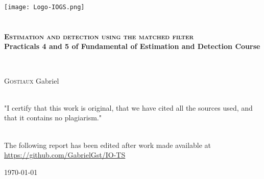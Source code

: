 \begin{titlepage}
\begin{center}

\texttt{[image: Logo-IOGS.png]}~\\[1.5cm]


\textsc{\Large }\\[0.5cm]

\HRule \\[0.4cm]

{\bfseries
\huge \textsc{Estimation and detection using the matched filter}\\[0.5cm]
\Large Practicals 4 and 5 of Fundamental of Estimation and Detection Course}

\HRule \\[1cm]

\begin{minipage}{0.8\textwidth}
\begin{flushleft} \large
\textsc{Gostiaux} Gabriel \\[1cm]
\end{flushleft}
\end{minipage}


\textsc{\Large }\\[1cm]
"I certify that this work is original, that we have cited all the sources used, and that it contains no plagiarism."

\textsc{\Large }\\[1cm]
The following report has been edited after work made available at \url{https://github.com/GabrielGst/IO-TS}




\vfill

{\large \today}

\end{center}
\end{titlepage}
